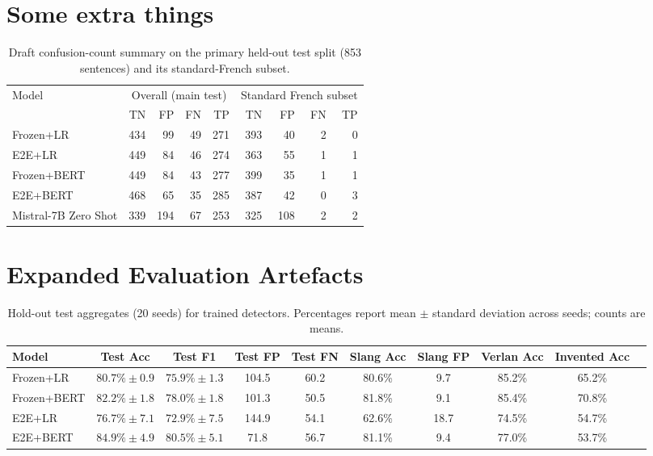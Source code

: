 \documentclass[12pt]{article}
\begin{document}
\renewcommand{\thesection}{Appendix \Alph{section}}

\section{Some extra things}


\begin{table}[H]
    \centering
    \footnotesize
    \begin{tabular}{lrrrrrrrr}
        \hline
        Model & \multicolumn{4}{c}{Overall (main test)} & \multicolumn{4}{c}{Standard French subset} \\
         & TN & FP & FN & TP & TN & FP & FN & TP \\
        \hline
        Frozen+LR & 434 & 99 & 49 & 271 & 393 & 40 & 2 & 0 \\
        E2E+LR & 449 & 84 & 46 & 274 & 363 & 55 & 1 & 1 \\
        Frozen+BERT & 449 & 84 & 43 & 277 & 399 & 35 & 1 & 1 \\
        E2E+BERT & 468 & 65 & 35 & 285 & 387 & 42 & 0 & 3 \\
        Mistral-7B Zero Shot & 339 & 194 & 67 & 253 & 325 & 108 & 2 & 2 \\
        \hline
    \end{tabular}
    \caption{Draft confusion-count summary on the primary held-out test split (853 sentences) and its standard-French subset.}
    \label{tab:main-test-confusion-draft}
\end{table}

\section{Expanded Evaluation Artefacts}

\begin{table}[H]
    \centering
    \footnotesize
    \begin{tabular}{lccccccccc}
        \hline
        Model & Test Acc & Test F1 & Test FP & Test FN & Slang Acc & Slang FP & Verlan Acc & Invented Acc \\
        \hline
        Frozen+LR & $80.7\%\pm0.9$ & $75.9\%\pm1.3$ & 104.5 & 60.2 & 80.6\% & 9.7 & 85.2\% & 65.2\% \\
        Frozen+BERT & $82.2\%\pm1.8$ & $78.0\%\pm1.8$ & 101.3 & 50.5 & 81.8\% & 9.1 & 85.4\% & 70.8\% \\
        E2E+LR & $76.7\%\pm7.1$ & $72.9\%\pm7.5$ & 144.9 & 54.1 & 62.6\% & 18.7 & 74.5\% & 54.7\% \\
        E2E+BERT & $84.9\%\pm4.9$ & $80.5\%\pm5.1$ & 71.8 & 56.7 & 81.1\% & 9.4 & 77.0\% & 53.7\% \\
        \hline
    \end{tabular}
    \caption{Hold-out test aggregates (20 seeds) for trained detectors. Percentages report mean $\pm$ standard deviation across seeds; counts are means.}
    \label{tab:appendix-holdout-aggregates}
\end{table}
\end{document}
